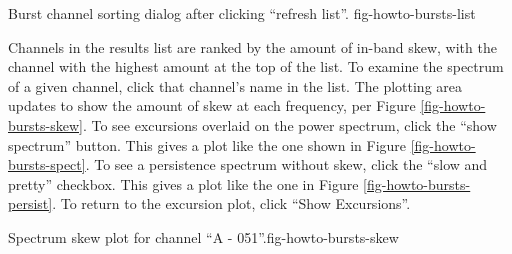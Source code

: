 {Burst channel sorting dialog after clicking ``refresh list''.}
{fig-howto-bursts-list}

Channels in the results list are ranked by the amount of in-band skew, with
the channel with the highest amount at the top of the list. To examine the
spectrum of a given channel, click that channel's name in the list. The
plotting area updates to show the amount of skew at each frequency, per
Figure \ref{fig-howto-bursts-skew}. To see excursions overlaid on the power
spectrum, click the ``show spectrum'' button. This gives a plot like the one
shown in Figure \ref{fig-howto-bursts-spect}. To see a persistence spectrum
without skew, click the ``slow and pretty'' checkbox. This gives a plot like
the one in Figure \ref{fig-howto-bursts-persist}. To return to the
excursion plot, click ``Show Excursions''.

{Spectrum skew plot for channel ``A - 051''.}{fig-howto-bursts-skew}

